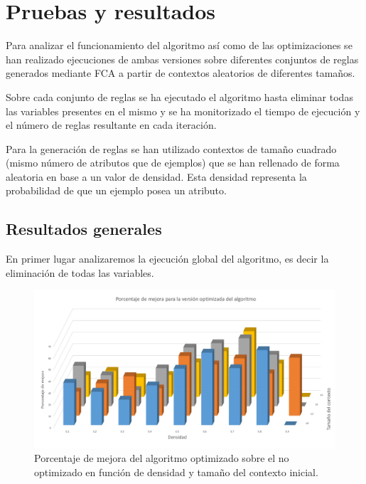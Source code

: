 \chapter*{Pruebas y resultados}
	
	Para analizar el funcionamiento del algoritmo así como de las optimizaciones se han realizado ejecuciones de ambas versiones sobre diferentes conjuntos de reglas generados mediante FCA a partir de contextos aleatorios de diferentes tamaños. 
	
	Sobre cada conjunto de reglas se ha ejecutado el algoritmo hasta eliminar todas las variables presentes en el mismo y se ha monitorizado el tiempo de ejecución y el número de reglas resultante en cada iteración.	
	
	Para la generación de reglas se han utilizado contextos de tamaño cuadrado (mismo número de atributos que de ejemplos) que se han rellenado de forma aleatoria en base a un valor de densidad. Esta densidad representa la probabilidad de que un ejemplo posea un atributo.
	

\newpage

\section*{Resultados generales}

	En primer lugar analizaremos la ejecución global del algoritmo, es decir la eliminación de todas las variables. 
	
	\begin{figure}[h]
	
		\includegraphics[width=1\linewidth]{05_Pruebas/graficas/general}
		\caption{Porcentaje de mejora del algoritmo optimizado sobre el no optimizado en función de densidad y tamaño del contexto inicial.}
		\label{fig:general}
	\end{figure}
	
